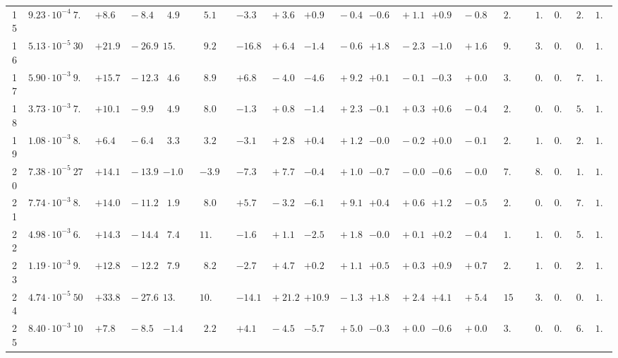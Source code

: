 \documentclass[12pt]{article}
\begin{document}
\begin{table}
\begin{tabular}{ccrr@{\hskip0pt}rrc@{\hskip0pt}r@{\hskip0pt}c@{\hskip0pt}r@{\hskip0pt}rr@{\hskip0pt}rr@{\hskip0pt}rr@{\hskip0pt}rr@{\hskip0pt}r@{\hskip0pt}r@{\hskip0pt}c|rr|r}
15 &$9.23 \cdot 10^{-4}$ &$ 7.4$  & ${+8.6~}$&${~-8.4}$ & $ 4.9$  & &$ 5.1$&&${-3.3~}$&${~+3.6}$ & ${+0.9~}$&${~-0.4}$ & ${-0.6~}$&${~+1.1}$ & ${+0.9~}$&${~-0.8}$ & &$ 2.1$&&$ 1.3$  & $0.83$  & $ 2.8$  & $1.07$   \\ 
16 &$5.13 \cdot 10^{-5}$ &$30.1$  & ${+21.9~}$&${~-26.9}$ & $15.6$  & &$ 9.2$&&${-16.8~}$&${~+6.4}$ & ${-1.4~}$&${~-0.6}$ & ${+1.8~}$&${~-2.3}$ & ${-1.0~}$&${~+1.6}$ & &$ 9.5$&&$ 3.5$  & $0.86$  & $ 0.9$  & $1.03$   \\ 
17 &$5.90 \cdot 10^{-3}$ &$ 9.5$  & ${+15.7~}$&${~-12.3}$ & $ 4.6$  & &$ 8.9$&&${+6.8~}$&${~-4.0}$ & ${-4.6~}$&${~+9.2}$ & ${+0.1~}$&${~-0.1}$ & ${-0.3~}$&${~+0.0}$ & &$ 3.2$&&$ 0.8$  & $0.73$  & $ 7.5$  & $1.04$   \\ 
18 &$3.73 \cdot 10^{-3}$ &$ 7.2$  & ${+10.1~}$&${~-9.9}$ & $ 4.9$  & &$ 8.0$&&${-1.3~}$&${~+0.8}$ & ${-1.4~}$&${~+2.3}$ & ${-0.1~}$&${~+0.3}$ & ${+0.6~}$&${~-0.4}$ & &$ 2.2$&&$ 0.6$  & $0.79$  & $ 5.4$  & $1.04$   \\ 
19 &$1.08 \cdot 10^{-3}$ &$ 8.6$  & ${+6.4~}$&${~-6.4}$ & $ 3.3$  & &$ 3.2$&&${-3.1~}$&${~+2.8}$ & ${+0.4~}$&${~+1.2}$ & ${-0.0~}$&${~-0.2}$ & ${+0.0~}$&${~-0.1}$ & &$ 2.3$&&$ 1.7$  & $0.84$  & $ 2.8$  & $1.04$   \\ 
20 &$7.38 \cdot 10^{-5}$ &$27.8$  & ${+14.1~}$&${~-13.9}$ & $-1.0$  & &$-3.9$&&${-7.3~}$&${~+7.7}$ & ${-0.4~}$&${~+1.0}$ & ${-0.7~}$&${~-0.0}$ & ${-0.6~}$&${~-0.0}$ & &$ 7.5$&&$ 8.2$  & $0.86$  & $ 1.7$  & $1.03$   \\ 
21 &$7.74 \cdot 10^{-3}$ &$ 8.7$  & ${+14.0~}$&${~-11.2}$ & $ 1.9$  & &$ 8.0$&&${+5.7~}$&${~-3.2}$ & ${-6.1~}$&${~+9.1}$ & ${+0.4~}$&${~+0.6}$ & ${+1.2~}$&${~-0.5}$ & &$ 2.8$&&$ 0.6$  & $0.73$  & $ 7.2$  & $1.04$   \\ 
22 &$4.98 \cdot 10^{-3}$ &$ 6.2$  & ${+14.3~}$&${~-14.4}$ & $ 7.4$  & &$11.7$&&${-1.6~}$&${~+1.1}$ & ${-2.5~}$&${~+1.8}$ & ${-0.0~}$&${~+0.1}$ & ${+0.2~}$&${~-0.4}$ & &$ 1.7$&&$ 1.0$  & $0.79$  & $ 5.2$  & $1.04$   \\ 
23 &$1.19 \cdot 10^{-3}$ &$ 9.1$  & ${+12.8~}$&${~-12.2}$ & $ 7.9$  & &$ 8.2$&&${-2.7~}$&${~+4.7}$ & ${+0.2~}$&${~+1.1}$ & ${+0.5~}$&${~+0.3}$ & ${+0.9~}$&${~+0.7}$ & &$ 2.3$&&$ 1.9$  & $0.83$  & $ 2.5$  & $1.05$   \\ 
24 &$4.74 \cdot 10^{-5}$ &$50.8$  & ${+33.8~}$&${~-27.6}$ & $13.9$  & &$10.4$&&${-14.1~}$&${~+21.2}$ & ${+10.9~}$&${~-1.3}$ & ${+1.8~}$&${~+2.4}$ & ${+4.1~}$&${~+5.4}$ & &$15.0$&&$ 3.6$  & $0.85$  & $ 0.8$  & $1.05$   \\ 
25 &$8.40 \cdot 10^{-3}$ &$10.4$  & ${+7.8~}$&${~-8.5}$ & $-1.4$  & &$ 2.2$&&${+4.1~}$&${~-4.5}$ & ${-5.7~}$&${~+5.0}$ & ${-0.3~}$&${~+0.0}$ & ${-0.6~}$&${~+0.0}$ & &$ 3.1$&&$ 0.5$  & $0.73$  & $ 6.8$  & $1.04$   \\ 

\end{tabular}
\end{table}
\end{document}
